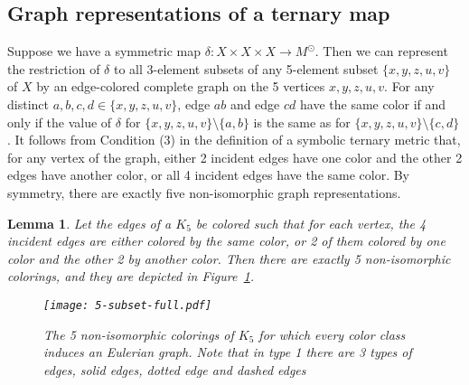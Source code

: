 \documentclass{article}
\newtheorem{lemma}{Lemma}
\begin{document}
\subsection{Graph representations of a ternary map}
\label{subsect:graphical}

Suppose we have a symmetric map $\delta: X\times X\times X \to M^{\odot}$.
Then we can represent the restriction of $\delta$ to all 3-element subsets 
of any 5-element subset $\{x,y,z,u,v\}$ of $X$ by an edge-colored complete 
graph on the 5 vertices 
$x,y,z,u,v$. For any distinct $a,b,c,d\in \{x,y,z,u,v\}$, edge $ab$ and edge 
$cd$ have the same color if and only if the value of $\delta$ for  
$\{x,y,z,u,v\}\setminus \{a,b\}$ is the same as  for 
$\{x,y,z,u,v\}\setminus \{c,d\}$.
It follows from Condition (3) in the definition of a symbolic ternary metric that, 
for any vertex of the graph, 
either 2 incident edges have one color and the other 2 edges have another 
color,
or all 4 incident edges have the same color. By symmetry, there are exactly five 
non-isomorphic graph representations.

\begin{lemma}\label{lem:graph}
Let the edges of a $K_5$ be colored such that for each vertex, the 4 
incident edges  
are either colored by the same color, or 2 of them colored by one color and 
the other 2 by another color.
Then there are exactly 5 non-isomorphic colorings, and they are depicted in 
Figure~\ref{fig:5-subset-full}. 

\begin{figure}[ht!]
\centering  
\texttt{[image: 5-subset-full.pdf]} 
\caption{The 5 non-isomorphic colorings of $K_5$ for which every color class induces an Eulerian graph. Note that in type 1 there 
are 3 types of edges, solid edges, dotted edge
and dashed edges} 
 \label{fig:5-subset-full} 
\end{figure}

\end{lemma}
\end{document}
